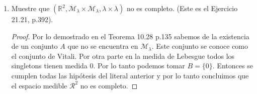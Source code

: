 \documentclass[letter,twoside,12pt]{article}
\numberwithin{equation}{section}
\begin{document}
\begin{enumerate}[label = (\textbf{\arabic*.})]
\begin{enumerate}[label = (\textbf{\alph*.})]
\begin{proof}
Vamos a demostrar que $ A \times B $ es el testigo que $ X \times Y $ no es completo.

En primer lugar vamos a demostrar que el rectángulo $ X \times B $ tiene medida 0. Por la definición de la medida $ \mu \times \nu $ tenemos que

$$ \mu \times \nu(X \times B) = \int_X \nu((X \times B)_x) \text{ }d\mu $$

Tenemos que $ (X \times B)_x $ es $ B $ para todo $ x \in X $. Luego

$$ \mu \times \nu(X \times B) = \int_X \nu(B) \text{ }d\mu  =  \int_X 0 \text{ }d\mu = 0$$

Claramente $ A \times B $ es un subconjunto de $ X \times B $, sin embargo este conjunto no se encuentra en la $ \sigma $- álgebra.

Para demostrar esto supongase que pertenece a la $ \sigma- $álgebra. Por el Teorema 21.4 p.380 tenemos que todo conjunto $ E^y $ pertenece a $ \mathcal{M} $ pero si tomamos $ y \in B $, entonces $ E^y = A $ y por hipótesis $ A \not \in \mathcal{M} $. Llegamos a una contradicción concluimos que $ A \times B $ no esta la $ \sigma- $álgebra y por lo tanto la medida no es completa.
\end{proof}

\item Muestre que $ (\mathbb{R}^2, \mathcal{M}_\lambda \times \mathcal{M}_\lambda,\lambda \times \lambda) $ no es completo. (Este es el Ejercicio 21.21, p.392).

\begin{proof}
Por lo demostrado en el Teorema 10.28 p.135 sabemos de la existencia de un conjunto $ A $ que no se encuentra en $ \mathcal{M}_{\lambda} $. Este conjunto se conoce como el conjunto de Vitali. Por otra parte en la medida de Lebesgue todos los singletons tienen medida 0. Por lo tanto podemos tomar $ B = \{0\} $. Entonces se cumplen todas las hipótesis del literal anterior y por lo tanto concluimos que el espacio medible $ \mathcal{R^2} $ no es completo.   
\end{proof}
\end{enumerate}
\end{enumerate}
\end{document}
